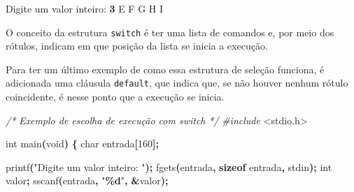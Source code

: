 \documentclass[
  11pt,
  a4paper,
]{scrbook}
\newenvironment{Shaded}{\begin{snugshade}}{\end{snugshade}}
\newcommand{\CommentTok}[1]{\textcolor[rgb]{0.56,0.35,0.01}{\textit{#1}}}
\newcommand{\DataTypeTok}[1]{\textcolor[rgb]{0.13,0.29,0.53}{#1}}
\newcommand{\DecValTok}[1]{\textcolor[rgb]{0.00,0.00,0.81}{#1}}
\newcommand{\ImportTok}[1]{#1}
\newcommand{\KeywordTok}[1]{\textcolor[rgb]{0.13,0.29,0.53}{\textbf{#1}}}
\newcommand{\NormalTok}[1]{#1}
\newcommand{\OperatorTok}[1]{\textcolor[rgb]{0.81,0.36,0.00}{\textbf{#1}}}
\newcommand{\PreprocessorTok}[1]{\textcolor[rgb]{0.56,0.35,0.01}{\textit{#1}}}
\newcommand{\SpecialCharTok}[1]{\textcolor[rgb]{0.81,0.36,0.00}{\textbf{#1}}}
\newcommand{\StringTok}[1]{\textcolor[rgb]{0.31,0.60,0.02}{#1}}
\begin{document}
\begin{Shaded}
\begin{Highlighting}[]
\NormalTok{Digite um valor inteiro: }\KeywordTok{ 3 }
\NormalTok{E}
\NormalTok{F}
\NormalTok{G}
\NormalTok{H}
\NormalTok{I}
\end{Highlighting}
\end{Shaded}

O conceito da estrutura \texttt{switch} é ter uma lista de comandos e,
por meio dos rótulos, indicam em que posição da lista se inicia a
execução.

Para ter um último exemplo de como essa estrutura de seleção funciona, é
adicionada uma cláusula \texttt{default}, que indica que, se não houver
nenhum rótulo coincidente, é nesse ponto que a execução se inicia.

\begin{Shaded}
\begin{Highlighting}[]
\CommentTok{/*}
\CommentTok{Exemplo de escolha de execução com switch}
\CommentTok{*/}
\PreprocessorTok{\#include }\ImportTok{\textless{}stdio.h\textgreater{}}

\DataTypeTok{int}\NormalTok{ main}\OperatorTok{(}\DataTypeTok{void}\OperatorTok{)} \OperatorTok{\{}
    \DataTypeTok{char}\NormalTok{ entrada}\OperatorTok{[}\DecValTok{160}\OperatorTok{];}

\NormalTok{    printf}\OperatorTok{(}\StringTok{"Digite um valor inteiro: "}\OperatorTok{);}
\NormalTok{    fgets}\OperatorTok{(}\NormalTok{entrada}\OperatorTok{,} \KeywordTok{sizeof}\NormalTok{ entrada}\OperatorTok{,}\NormalTok{ stdin}\OperatorTok{);}
    \DataTypeTok{int}\NormalTok{ valor}\OperatorTok{;}
\NormalTok{    sscanf}\OperatorTok{(}\NormalTok{entrada}\OperatorTok{,} \StringTok{"}\SpecialCharTok{\%d}\StringTok{"}\OperatorTok{,} \OperatorTok{\&}\NormalTok{valor}\OperatorTok{);}


\end{Highlighting}
\end{Shaded}
\end{document}
